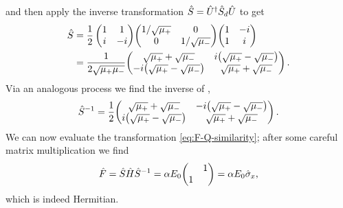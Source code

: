         and then apply the inverse transformation $\hat{S} = \hat{U}^\dag \hat{S}_d \hat{U}$ to get
        \begin{align*}
            \hS 
            &= \frac{1}{2}\pmqty{1 & 1 \\ i & -i} \!\pmqty{\dmat[0]{1/\sqrt{\mu_{+}}, 1/\sqrt{\mu_{-}}}} \!\pmqty{1 & -i \\ 1 & i} \\
            &= \frac{1}{2\sqrt{\mu_{+}\mu_{-}}} \!\pmqty{\admat[\sqrt{\mu_{+}} + \sqrt{\mu_{-}}]{i\pqty{\sqrt{\mu_{+}} - \sqrt{\mu_{-}}} , -i\pqty{\sqrt{\mu_{+}} - \sqrt{\mu_{-}}}}}
            \myperiod
        \end{align*}
        Via an analogous process we find the inverse of \hS,
        \begin{align*}
            \hS^{-1} = \frac{1}{2} \!\pmqty{\admat[\sqrt{\mu_{+}} + \sqrt{\mu_{-}}]{-i\pqty{\sqrt{\mu_{+}} - \sqrt{\mu_{-}}} , i\pqty{\sqrt{\mu_{+}} - \sqrt{\mu_{-}}}}}
            \myperiod
        \end{align*}
        We can now evaluate the transformation \eqref{eq:F-Q-similarity}; after some careful matrix multiplication we find 
        \begin{equation*}
            \hF = \hS \hH \hS^{-1}
            = \alpha E_0 \!\pmqty{\admat{1,1}}
            = \alpha E_0 \togglehat{\sigma}_x
            \mycomma
        \end{equation*}
        which is indeed Hermitian.
        
